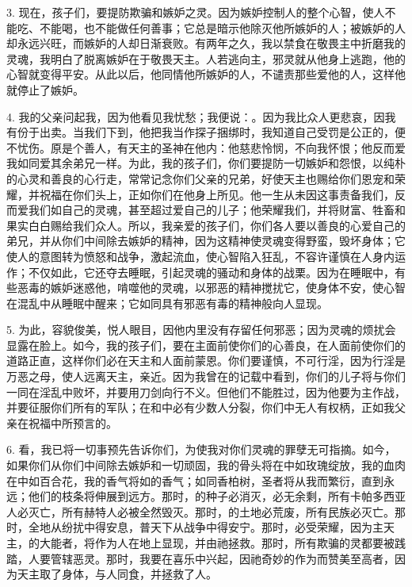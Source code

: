3. 现在，孩子们，要提防欺骗和嫉妒之灵。因为嫉妒控制人的整个心智，使人不能吃、不能喝，也不能做任何善事；它总是暗示他除灭他所嫉妒的人；被嫉妒的人却永远兴旺，而嫉妒的人却日渐衰败。有两年之久，我以禁食在敬畏主中折磨我的灵魂，我明白了脱离嫉妒在于敬畏天主。人若逃向主，邪灵就从他身上逃跑，他的心智就变得平安。从此以后，他同情他所嫉妒的人，不谴责那些爱他的人，这样他就停止了嫉妒。\par

4. 我的父亲问起我，因为他看见我忧愁；我便说：。因为我比众人更悲哀，因我有份于出卖。当我们下到，他把我当作探子捆绑时，我知道自己受罚是公正的，便不忧伤。原是个善人，有天主的圣神在他内：他慈悲怜悯，不向我怀恨；他反而爱我如同爱其余弟兄一样。为此，我的孩子们，你们要提防一切嫉妒和怨恨，以纯朴的心灵和善良的心行走，常常记念你们父亲的兄弟，好使天主也赐给你们恩宠和荣耀，并祝福在你们头上，正如你们在他身上所见。他一生从未因这事责备我们，反而爱我们如自己的灵魂，甚至超过爱自己的儿子；他荣耀我们，并将财富、牲畜和果实白白赐给我们众人。所以，我亲爱的孩子们，你们各人要以善良的心爱自己的弟兄，并从你们中间除去嫉妒的精神，因为这精神使灵魂变得野蛮，毁坏身体；它使人的意图转为愤怒和战争，激起流血，使心智陷入狂乱，不容许谨慎在人身内运作；不仅如此，它还夺去睡眠，引起灵魂的骚动和身体的战栗。因为在睡眠中，有些恶毒的嫉妒迷惑他，啃噬他的灵魂，以邪恶的精神搅扰它，使身体不安，使心智在混乱中从睡眠中醒来；它如同具有邪恶有毒的精神般向人显现。\par

5. 为此，容貌俊美，悦人眼目，因他内里没有存留任何邪恶；因为灵魂的烦扰会显露在脸上。如今，我的孩子们，要在主面前使你们的心善良，在人面前使你们的道路正直，这样你们必在天主和人面前蒙恩。你们要谨慎，不可行淫，因为行淫是万恶之母，使人远离天主，亲近。因为我曾在的记载中看到，你们的儿子将与你们一同在淫乱中败坏，并要用刀剑向行不义。但他们不能胜过，因为他要为主作战，并要征服你们所有的军队；在和中必有少数人分裂，你们中无人有权柄，正如我父亲在祝福中所预言的。\par

6. 看，我已将一切事预先告诉你们，为使我对你们灵魂的罪孽无可指摘。如今，如果你们从你们中间除去嫉妒和一切顽固，我的骨头将在中如玫瑰绽放，我的血肉在中如百合花，我的香气将如的香气；如同香柏树，圣者将从我而繁衍，直到永远；他们的枝条将伸展到远方。那时，的种子必消灭，必无余剩，所有卡帕多西亚人必灭亡，所有赫特人必被全然毁灭。那时，的土地必荒废，所有民族必灭亡。那时，全地从纷扰中得安息，普天下从战争中得安宁。那时，必受荣耀，因为主天主，的大能者，将作为人在地上显现，并由祂拯救。那时，所有欺骗的灵都要被践踏，人要管辖恶灵。那时，我要在喜乐中兴起，因祂奇妙的作为而赞美至高者，因为天主取了身体，与人同食，并拯救了人。\par

